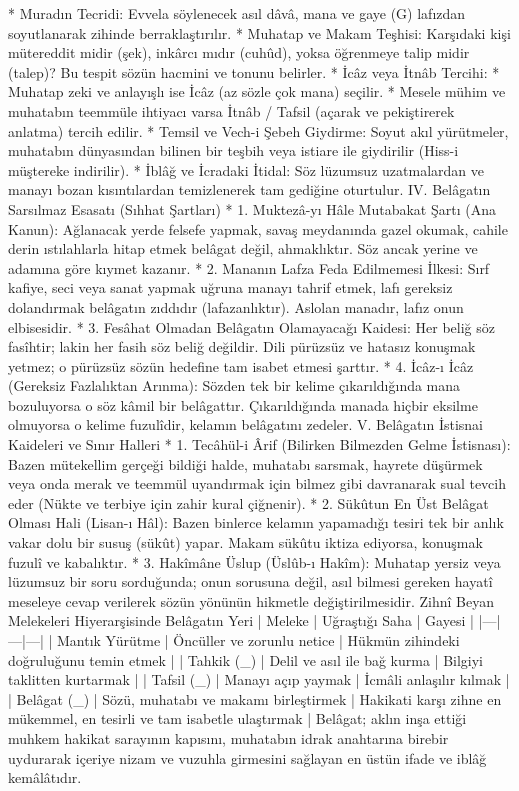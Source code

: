 \documentclass[11pt,a4paper]{article}
\begin{document}
 * Muradın Tecridi: Evvela söylenecek asıl dâvâ, mana ve gaye (G) lafızdan soyutlanarak zihinde berraklaştırılır.
 * Muhatap ve Makam Teşhisi: Karşıdaki kişi mütereddit midir (şek), inkârcı mıdır (cuhûd), yoksa öğrenmeye talip midir (talep)? Bu tespit sözün hacmini ve tonunu belirler.
 * İcâz veya İtnâb Tercihi:
   * Muhatap zeki ve anlayışlı ise İcâz (az sözle çok mana) seçilir.
   * Mesele mühim ve muhatabın teemmüle ihtiyacı varsa İtnâb / Tafsil (açarak ve pekiştirerek anlatma) tercih edilir.
 * Temsil ve Vech-i Şebeh Giydirme: Soyut akıl yürütmeler, muhatabın dünyasından bilinen bir teşbih veya istiare ile giydirilir (Hiss-i müştereke indirilir).
 * İblâğ ve İcradaki İtidal: Söz lüzumsuz uzatmalardan ve manayı bozan kısıntılardan temizlenerek tam gediğine oturtulur.
IV. Belâgatın Sarsılmaz Esasatı (Sıhhat Şartları)
 * 1. Muktezâ-yı Hâle Mutabakat Şartı (Ana Kanun):
   Ağlanacak yerde felsefe yapmak, savaş meydanında gazel okumak, cahile derin ıstılahlarla hitap etmek belâgat değil, ahmaklıktır. Söz ancak yerine ve adamına göre kıymet kazanır.
 * 2. Mananın Lafza Feda Edilmemesi İlkesi:
   Sırf kafiye, seci veya sanat yapmak uğruna manayı tahrif etmek, lafı gereksiz dolandırmak belâgatın zıddıdır (lafazanlıktır). Aslolan manadır, lafız onun elbisesidir.
 * 3. Fesâhat Olmadan Belâgatın Olamayacağı Kaidesi:
   Her beliğ söz fasîhtir; lakin her fasih söz beliğ değildir. Dili pürüzsüz ve hatasız konuşmak yetmez; o pürüzsüz sözün hedefine tam isabet etmesi şarttır.
 * 4. İcâz-ı İcâz (Gereksiz Fazlalıktan Arınma):
   Sözden tek bir kelime çıkarıldığında mana bozuluyorsa o söz kâmil bir belâgattır. Çıkarıldığında manada hiçbir eksilme olmuyorsa o kelime fuzulîdir, kelamın belâgatını zedeler.
V. Belâgatın İstisnai Kaideleri ve Sınır Halleri
 * 1. Tecâhül-i Ârif (Bilirken Bilmezden Gelme İstisnası):
   Bazen mütekellim gerçeği bildiği halde, muhatabı sarsmak, hayrete düşürmek veya onda merak ve teemmül uyandırmak için bilmez gibi davranarak sual tevcih eder (Nükte ve terbiye için zahir kural çiğnenir).
 * 2. Sükûtun En Üst Belâgat Olması Hali (Lisan-ı Hâl):
   Bazen binlerce kelamın yapamadığı tesiri tek bir anlık vakar dolu bir susuş (sükût) yapar. Makam sükûtu iktiza ediyorsa, konuşmak fuzulî ve kabalıktır.
 * 3. Hakîmâne Üslup (Üslûb-ı Hakîm):
   Muhatap yersiz veya lüzumsuz bir soru sorduğunda; onun sorusuna değil, asıl bilmesi gereken hayatî meseleye cevap verilerek sözün yönünün hikmetle değiştirilmesidir.
Zihnî Beyan Melekeleri Hiyerarşisinde Belâgatın Yeri
| Meleke | Uğraştığı Saha | Gayesi |
|---|---|---|
| Mantık Yürütme | Öncüller ve zorunlu netice | Hükmün zihindeki doğruluğunu temin etmek |
| Tahkik (_{}) | Delil ve asıl ile bağ kurma | Bilgiyi taklitten kurtarmak |
| Tafsil (_{}) | Manayı açıp yaymak | İcmâli anlaşılır kılmak |
| Belâgat (_{}) | Sözü, muhatabı ve makamı birleştirmek | Hakikati karşı zihne en mükemmel, en tesirli ve tam isabetle ulaştırmak |
Belâgat; aklın inşa ettiği muhkem hakikat sarayının kapısını, muhatabın idrak anahtarına birebir uydurarak içeriye nizam ve vuzuhla girmesini sağlayan en üstün ifade ve iblâğ kemâlâtıdır.
\end{document}
